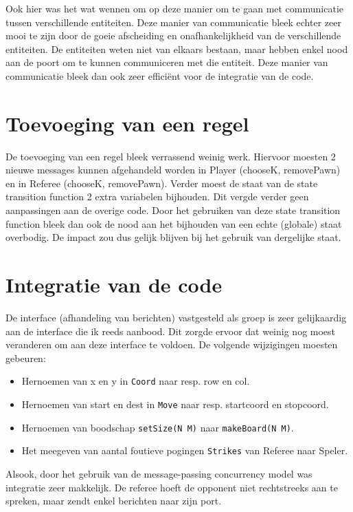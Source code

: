 \documentclass{article}
\begin{document}
Ook hier was het wat wennen om op deze manier om te gaan met communicatie tussen verschillende entiteiten. Deze manier van communicatie bleek echter zeer mooi te zijn door de goeie afscheiding en onafhankelijkheid van de verschillende entiteiten. De entiteiten weten niet van elkaars bestaan, maar hebben enkel nood aan de poort om te kunnen communiceren met die entiteit. Deze manier van communicatie bleek dan ook zeer efficiënt voor de integratie van de code.


\section{Toevoeging van een regel}
De toevoeging van een regel bleek verrassend weinig werk. Hiervoor moesten 2 nieuwe messages kunnen afgehandeld worden in Player (chooseK, removePawn) en in Referee (chooseK, removePawn). Verder moest de staat van de state transition function 2 extra variabelen bijhouden. Dit vergde verder geen aanpassingen aan de overige code.
Door het gebruiken van deze state transition function bleek dan ook de nood aan het bijhouden van een echte (globale) staat overbodig. De impact zou dus gelijk blijven bij het gebruik van dergelijke staat.


\section{Integratie van de code}

De interface (afhandeling van berichten) vastgesteld als groep is zeer gelijkaardig aan de interface die ik reeds aanbood. Dit zorgde ervoor dat weinig nog moest veranderen om aan deze interface te voldoen. De volgende wijzigingen moesten gebeuren:
\begin{itemize}
	\item Hernoemen van x en y in \texttt{Coord} naar resp. row en col.
	\item Hernoemen van start en dest in \texttt{Move} naar resp. startcoord en stopcoord. 
	\item Hernoemen van boodschap \texttt{setSize(N M)} naar \texttt{makeBoard(N M)}.
	\item Het meegeven van aantal foutieve pogingen \texttt{Strikes} van Referee naar Speler.
\end{itemize}
Alsook, door het gebruik van de message-passing concurrency model was integratie zeer makkelijk. De referee hoeft de opponent niet rechtstreeks aan te spreken, maar zendt enkel berichten naar zijn port. 
	
\end{document}
